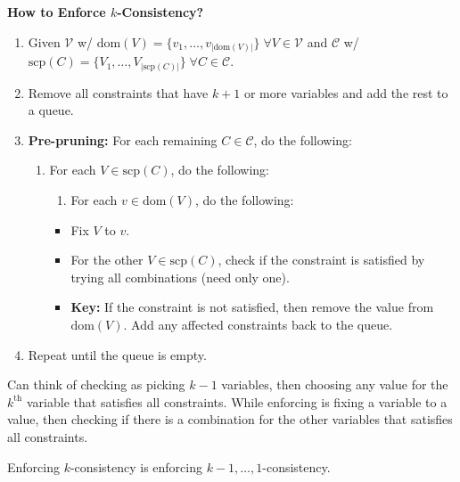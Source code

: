 \begin{process} \textbf{How to Enforce $k$-Consistency?} 
    \begin{enumerate}
        \item Given $\mathcal{V}$ w/ $\text{dom}(V) = \{v_1,\ldots,v_{|\text{dom}(V)|}\} \; \forall V \in \mathcal{V}$ and $\mathcal{C}$ w/ $\text{scp}(C) = \{V_1,\ldots,V_{|\text{scp}(C)|}\} \; \forall C \in \mathcal{C}$.
        \item Remove all constraints that have $k+1$ or more variables and add the rest to a queue.
        \item \textbf{Pre-pruning:} For each remaining $C \in \mathcal{C}$, do the following:
        \begin{enumerate}
            \item For each $V \in \text{scp}(C)$, do the following:
            \begin{enumerate}
                \item For each $v \in \text{dom}(V)$, do the following:
            \end{enumerate}
            \begin{itemize}
                \item Fix $V$ to $v$.
                \item For the other $V \in \text{scp}(C)$, check if the constraint is satisfied by trying all combinations (need only one). 
                \item \textbf{Key:} If the constraint is not satisfied, then remove the value from $\text{dom}(V)$. Add any affected constraints back to the queue.
            \end{itemize}
        \end{enumerate}
        \item Repeat until the queue is empty.
    \end{enumerate}
\end{process}

\begin{warning}
    Can think of checking as picking $k-1$ variables, then choosing any value for the $k^\text{th}$ variable that satisfies all constraints. While enforcing is fixing a variable to a value, then checking if there is a combination for the other variables that satisfies all constraints.
\end{warning}

\begin{warning}
    Enforcing $k$-consistency is enforcing $k-1,\ldots,1$-consistency.
\end{warning}

